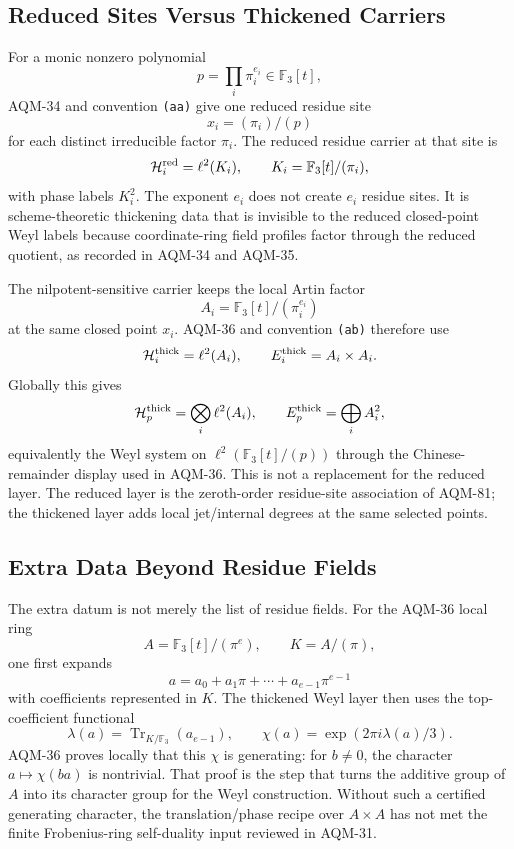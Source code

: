 \subsection{Reduced Sites Versus Thickened Carriers}

For a monic nonzero polynomial
\[
  p=\prod_i\pi_i^{e_i}\in\mathbb F_3[t],
\]
AQM-34 and convention \texttt{(aa)} give one reduced residue site
\[
  x_i=(\pi_i)/(p)
\]
for each distinct irreducible factor \(\pi_i\).  The reduced residue carrier
at that site is
\[
  \mathcal H_i^{\rm red}=\ell^2(K_i),
  \qquad K_i=\mathbb F_3[t]/(\pi_i),
\]
with phase labels \(K_i^2\).  The exponent \(e_i\) does not create \(e_i\)
residue sites.  It is scheme-theoretic thickening data that is invisible to
the reduced closed-point Weyl labels because coordinate-ring field profiles
factor through the reduced quotient, as recorded in AQM-34 and AQM-35.

The nilpotent-sensitive carrier keeps the local Artin factor
\[
  A_i=\mathbb F_3[t]/(\pi_i^{e_i})
\]
at the same closed point \(x_i\).  AQM-36 and convention \texttt{(ab)}
therefore use
\[
  \mathcal H_i^{\rm thick}=\ell^2(A_i),
  \qquad E_i^{\rm thick}=A_i\times A_i.
\]
Globally this gives
\[
  \mathcal H_p^{\rm thick}=\bigotimes_i\ell^2(A_i),
  \qquad E_p^{\rm thick}=\bigoplus_i A_i^2,
\]
equivalently the Weyl system on \(\ell^2(\mathbb F_3[t]/(p))\) through the
Chinese-remainder display used in AQM-36.  This is not a replacement for the
reduced layer.  The reduced layer is the zeroth-order residue-site
association of AQM-81; the thickened layer adds local jet/internal degrees at
the same selected points.

\subsection{Extra Data Beyond Residue Fields}

The extra datum is not merely the list of residue fields.  For the AQM-36
local ring
\[
  A=\mathbb F_3[t]/(\pi^e),\qquad K=A/(\pi),
\]
one first expands
\[
  a=a_0+a_1\pi+\cdots+a_{e-1}\pi^{e-1}
\]
with coefficients represented in \(K\).  The thickened Weyl layer then uses
the top-coefficient functional
\[
  \lambda(a)=\operatorname{Tr}_{K/\mathbb F_3}(a_{e-1}),
  \qquad
  \chi(a)=\exp(2\pi i\lambda(a)/3).
\]
AQM-36 proves locally that this \(\chi\) is generating: for \(b\ne0\), the
character \(a\mapsto\chi(ba)\) is nontrivial.  That proof is the step that
turns the additive group of \(A\) into its character group for the Weyl
construction.  Without such a certified generating character, the
translation/phase recipe over \(A\times A\) has not met the finite
Frobenius-ring self-duality input reviewed in AQM-31.

